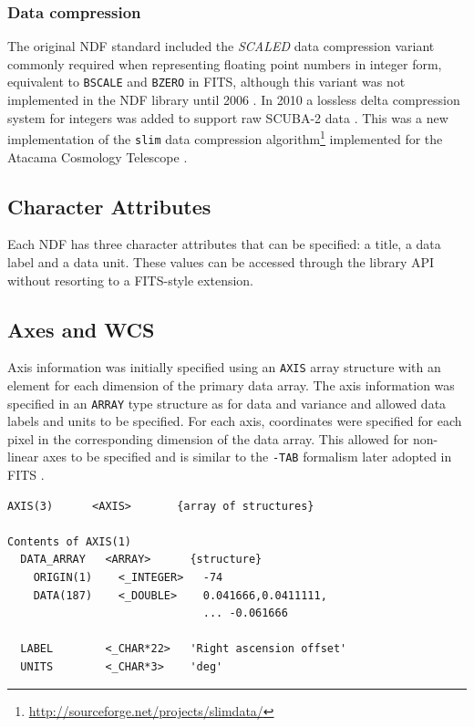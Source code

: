 \documentclass[final,authoryear,5p,times,twocolumn]{elsarticle}
\begin{document}
\subsubsection{Data compression}

The original NDF standard included the \emph{SCALED} data compression
variant commonly required when representing floating point numbers in
integer form, equivalent to \texttt{BSCALE} and \texttt{BZERO} in
FITS, although this variant was not implemented in the NDF library
until 2006 \citep{2008ASPC..394..650C}. In 2010 a lossless delta
compression system for integers was added to support raw SCUBA-2 data
\citep{2013MNRAS.430.2513H}. This was a new implementation of the
\texttt{slim} data compression
algorithm\footnote{\url{http://sourceforge.net/projects/slimdata/}}
implemented for the Atacama Cosmology Telescope
\citep{2004SPIE.5498....1F}.

\subsection{Character Attributes}

Each NDF has three character attributes that can be specified: a
title, a data label and a data unit. These values can be accessed
through the library API without resorting to a FITS-style extension.

\subsection{Axes and WCS}

Axis information was initially specified using an \texttt{AXIS} array
structure with an element for each dimension of the primary data
array. The axis information was specified in an \texttt{ARRAY} type
structure as for data and variance and allowed data labels and units
to be specified. For each axis, coordinates were specified for each
pixel in the corresponding dimension of the data array. This allowed
for non-linear axes to be specified and is similar to the
\texttt{-TAB} formalism later adopted in FITS \citep{2006A&A...446..747G}.

{\small
\begin{verbatim}
AXIS(3)      <AXIS>       {array of structures}

Contents of AXIS(1)
  DATA_ARRAY   <ARRAY>      {structure}
    ORIGIN(1)    <_INTEGER>   -74
    DATA(187)    <_DOUBLE>    0.041666,0.0411111,
                              ... -0.061666

  LABEL        <_CHAR*22>   'Right ascension offset'
  UNITS        <_CHAR*3>    'deg'
\end{verbatim}
}
\end{document}

